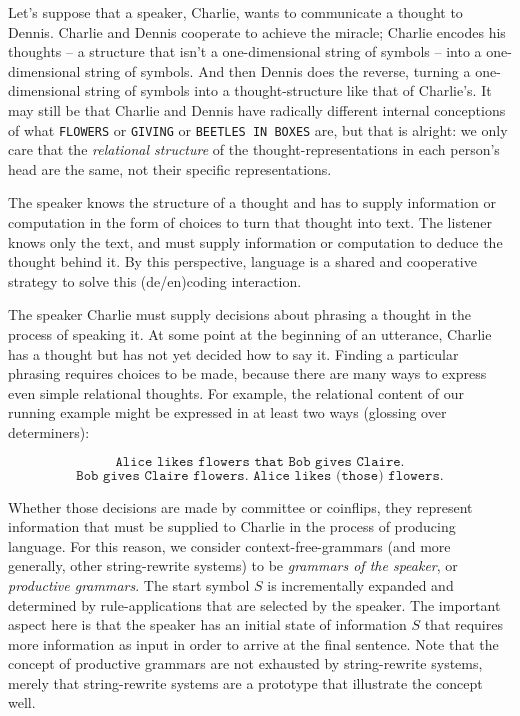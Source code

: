  Let's suppose that a speaker, Charlie, wants to communicate a thought to Dennis. Charlie and Dennis cooperate to achieve the miracle; Charlie encodes his thoughts -- a structure that isn't a one-dimensional string of symbols -- into a one-dimensional string of symbols. And then Dennis does the reverse, turning a one-dimensional string of symbols into a thought-structure like that of Charlie's. It may still be that Charlie and Dennis have radically different internal conceptions of what \texttt{FLOWERS} or \texttt{GIVING} or \texttt{BEETLES IN BOXES} are, but that is alright: we only care that the \emph{relational structure} of the thought-representations in each person's head are the same, not their specific representations.

 The speaker knows the structure of a thought and has to supply information or computation in the form of choices to turn that thought into text. The listener knows only the text, and must supply information or computation to deduce the thought behind it. By this perspective, language is a shared and cooperative strategy to solve this (de/en)coding interaction.

 The speaker Charlie must supply decisions about phrasing a thought in the process of speaking it. At some point at the beginning of an utterance, Charlie has a thought but has not yet decided how to say it. Finding a particular phrasing requires choices to be made, because there are many ways to express even simple relational thoughts. For example, the relational content of our running example might be expressed in at least two ways (glossing over determiners):

\[\texttt{Alice likes flowers that Bob gives Claire.}\]
\[\texttt{Bob gives Claire flowers. Alice likes (those) flowers.}\]

Whether those decisions are made by committee or coinflips, they represent information that must be supplied to Charlie in the process of producing language. For this reason, we consider context-free-grammars (and more generally, other string-rewrite systems) to be \emph{grammars of the speaker}, or \emph{productive grammars}. The start symbol $S$ is incrementally expanded and determined by rule-applications that are selected by the speaker. The important aspect here is that the speaker has an initial state of information $S$ that requires more information as input in order to arrive at the final sentence. Note that the concept of productive grammars are not exhausted by string-rewrite systems, merely that string-rewrite systems are a prototype that illustrate the concept well.

